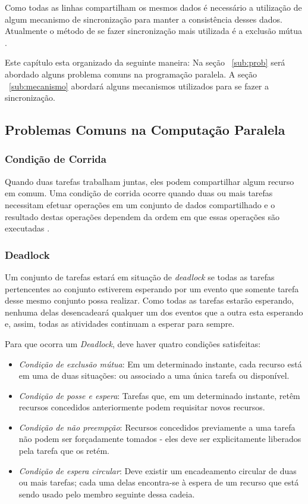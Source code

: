 Como todas as linhas compartilham os mesmos dados é necessário a utilização
de algum mecanismo de sincronização para manter a consistência desses
dados. Atualmente o método de se fazer sincronização mais utilizada é
a exclusão mútua \cite{ARTOFMPP, MCRT}. 

Este capítulo esta organizado da seguinte maneira: Na seção ~\ref{sub:prob}
será abordado alguns problema comuns na programação paralela. A seção
~\ref{sub:mecanismo} abordará alguns mecanismos utilizados para se fazer
a sincronização.

\subsection{Problemas Comuns na Computação Paralela}

\subsubsection{Condição de Corrida}

Quando duas tarefas trabalham juntas, eles podem compartilhar algum recurso
em comum. Uma condição de corrida ocorre quando duas ou mais tarefas
necessitam efetuar operações em um conjunto de dados compartilhado e o 
resultado destas operações dependem da ordem em que essas operações
são executadas \cite{tanen}.

\subsubsection{Deadlock}

Um conjunto de tarefas estará em situação de \textit{deadlock} se todas as
tarefas pertencentes ao conjunto estiverem esperando por um evento que somente
tarefa desse mesmo conjunto possa realizar. Como todas as tarefas estarão
esperando, nenhuma delas desencadeará qualquer um dos eventos que a outra
esta esperando e, assim, todas as atividades continuam a esperar para sempre.

Para que ocorra um \textit{Deadlock}, deve haver quatro condições satisfeitas:

\begin{itemize}
\item \textit{Condição de exclusão mútua}: Em um determinado instante,
cada recurso está em uma de duas situações: ou associado a uma única tarefa
ou disponível. 
\item \textit{Condição de posse e espera}: Tarefas que,
em um determinado instante, retêm recursos concedidos anteriormente podem
requisitar novos recursos. 
\item \textit{Condição de não preempção}:
Recursos concedidos previamente a uma tarefa não podem ser forçadamente
tomados - eles deve ser explicitamente liberados pela tarefa que os retém.
\item \textit{Condição de espera circular}: Deve existir um encadeamento
circular de duas ou mais tarefas; cada uma delas encontra-se à espera de
um recurso que está sendo usado pelo membro seguinte dessa cadeia.
\end{itemize}

